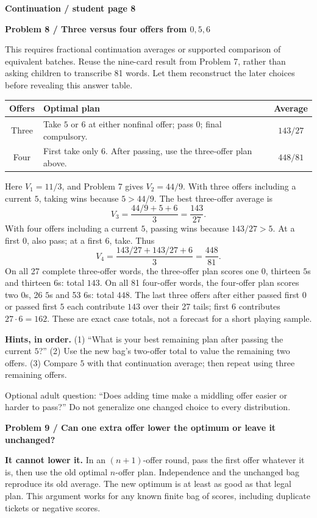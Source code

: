 \documentclass[11pt,letterpaper]{article}
\newcommand{\topic}[1]{\par\textbf{\large #1}\par}
\newcommand{\task}[2]{\par\textbf{Problem #1 / #2}\par}
\newcommand{\hint}[1]{\textbf{Hints, in order.} #1\par}
\begin{document}
\newpage
\topic{Continuation / student page 8}
\task{8}{Three versus four offers from $0,5,6$}
This requires fractional continuation averages or supported comparison of
equivalent batches. Reuse the nine-card result from Problem 7, rather than
asking children to transcribe 81 words. Let them reconstruct the later choices
before revealing this answer table.
\begin{center}
\begin{tabular}{@{}cp{4.12in}c@{}}\toprule
Offers & Optimal plan & Average \\\midrule
Three & Take $5$ or $6$ at either nonfinal offer; pass $0$; final compulsory. & $143/27$ \\
Four & First take only $6$. After passing, use the three-offer plan above. & $448/81$ \\\bottomrule
\end{tabular}\end{center}
Here $V_1=11/3$, and Problem 7 gives $V_2=44/9$.
With three offers including a current $5$, taking wins because $5>44/9$.
The best three-offer average is
\[
 V_3=\frac{44/9+5+6}{3}=\frac{143}{27}.
\]
With four offers including a current $5$, passing wins because $143/27>5$.
At a first $0$, also pass; at a first $6$, take. Thus
\[
 V_4=\frac{143/27+143/27+6}{3}=\frac{448}{81}.
\]
On all 27 complete three-offer words, the three-offer plan scores one $0$,
thirteen $5$s and thirteen $6$s: total $143$. On all 81 four-offer words,
the four-offer plan scores two $0$s, 26 $5$s and 53 $6$s: total $448$.
The last three offers after either passed first $0$ or passed first $5$ each
contribute $143$ over their 27 tails; first $6$ contributes $27\cdot6=162$.
These are exact case totals, not a forecast for a short playing sample.

\hint{(1) ``What is your best remaining plan after passing the current $5$?''
(2) Use the new bag's two-offer total to value the remaining two offers.
(3) Compare $5$ with that continuation average; then repeat using three
remaining offers.}
Optional adult question: ``Does adding time make a middling offer easier or
harder to pass?'' Do not generalize one changed choice to every distribution.

\task{9}{Can one extra offer lower the optimum or leave it unchanged?}
\textbf{It cannot lower it.} In an $(n+1)$-offer round, pass the first offer
whatever it is, then use the old optimal $n$-offer plan. Independence and the
unchanged bag reproduce its old average. The new optimum is at least as good
as that legal plan. This argument works for any known finite bag of scores,
including duplicate tickets or negative scores.
\end{document}
